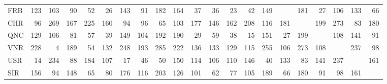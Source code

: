 \documentclass[12pt,a4paper]{report}
\theoremstyle{break}
\theoremstyle{plain}
\begin{document}
\begin{sideways}
\begin{tabular}{|l|r|r|r|r|r|r|r|r|r|r||r|r|r|r|r|r|r|r|r|r|}
FRB & 123 & 103 &  90 &  52 &  26 & 143 &  91 & 182 & 164 &  37 &  36 &  23 &  42 & 149 & & 181 &  27 & 106 & 133 &  66 \\
CHR &  96 & 269 & 167 & 225 & 160 &  94 &  96 &  65 & 103 & 177 & 146 & 162 & 208 & 116 & 181 & & 199 & 273 &  83 & 180 \\
QNC & 129 & 106 &  81 &  57 &  39 & 149 & 104 & 192 & 190 &  29 &  59 &  38 &  15 & 151 &  27 & 199 & & 108 & 141 &  91 \\
VNR & 228 &   4 & 189 &  54 & 132 & 248 & 193 & 285 & 222 & 136 & 133 & 129 & 115 & 255 & 106 & 273 & 108 & & 237 &  98 \\
USR &  14 & 234 &  88 & 184 & 107 &  17 &  46 &  50 & 150 & 114 & 106 & 110 & 146 &  40 & 133 &  83 & 141 & 237 & & 161 \\
SIR & 156 &  94 & 148 &  65 &  80 & 176 & 116 & 203 & 126 & 101 &  62 &  77 & 105 & 189 &  66 & 180 &  91 &  98 & 161 & \\
\hline\end{tabular}
\end{sideways}
\end{document}
